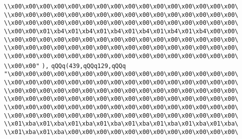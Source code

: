 \verb|\\x00\x00\x00\x00\x00\x00\x00\x00\x00\x00\x00\x00\x00\x00\x00\x00\|\newline
\verb|\\x00\x00\x00\x00\x00\x00\x00\x00\x00\x00\x00\x00\x00\x00\x00\x00\|\newline
\verb|\\x00\x00\x00\x00\x00\x00\x00\x00\x00\x00\x00\x00\x00\x00\x00\x00\|\newline
\verb|\\x00\x00\x01\xb4\x01\xb4\x01\xb4\x01\xb4\x01\xb4\x01\xb4\x00\x00\|\newline
\verb|\\x00\x00\x00\x00\x00\x00\x00\x00\x00\x00\x00\x00\x00\x00\x00\x00\|\newline
\verb|\\x00\x00\x00\x00\x00\x00\x00\x00\x00\x00\x00\x00\x00\x00\x00\x00\|\newline
\verb|\\x00\x00\x00\x00\x00\x00\x00\x00\x00\x00\x00\x00\x00\x00\x00\x00\|\newline
\verb|\\x00\x00"|\newline
\verb|),|\newline
\verb|qQQq(439,qQQq129,qQQq|\newline
\verb|"\x00\x00\x00\x00\x00\x00\x00\x00\x00\x00\x00\x00\x00\x00\x00\x00\|\newline
\verb|\\x00\x00\x00\x00\x00\x00\x00\x00\x00\x00\x00\x00\x00\x00\x00\x00\|\newline
\verb|\\x00\x00\x00\x00\x00\x00\x00\x00\x00\x00\x00\x00\x00\x00\x00\x00\|\newline
\verb|\\x00\x00\x00\x00\x00\x00\x00\x00\x00\x00\x00\x00\x00\x00\x00\x00\|\newline
\verb|\\x00\x00\x00\x00\x00\x00\x00\x00\x00\x00\x00\x00\x00\x00\x00\x00\|\newline
\verb|\\x00\x00\x00\x00\x00\x00\x00\x00\x00\x00\x00\x00\x00\x00\x00\x00\|\newline
\verb|\\x01\xba\x01\xba\x01\xba\x01\xba\x01\xba\x01\xba\x01\xba\x01\xba\|\newline
\verb|\\x01\xba\x01\xba\x00\x00\x00\x00\x00\x00\x00\x00\x00\x00\x00\x00\|\newline
